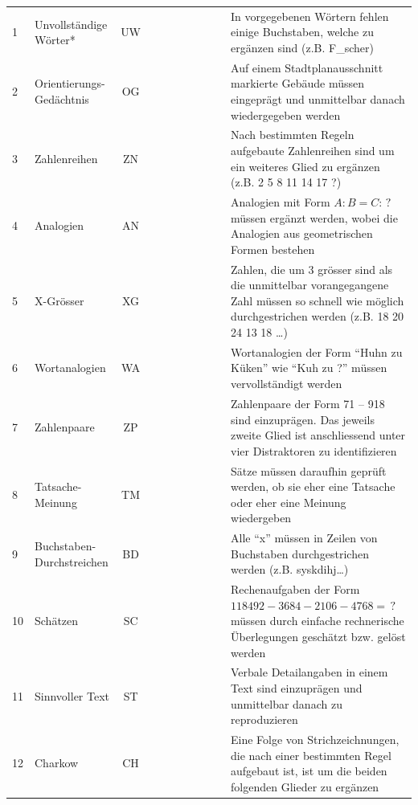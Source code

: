 \documentclass[11pt, twoside, a4paper]{book}		%
\begin{document}
\begin{table}
\begin{adjustbox}{width=\textwidth,totalheight=.9\textheight,keepaspectratio}
\begin{threeparttable}
\begin{tabular}{l l c c c c p{.0001cm} c c c p{20cm}}
				\hline
				1				&	Unvollständige Wörter*	&	UW			&&	\checkmark	&&&\checkmark&&& In vorgegebenen Wörtern fehlen einige Buchstaben, welche zu ergänzen sind (z.B. F\_scher)	\\
				2				&	Orientierungs-Gedächtnis	&	OG		&&&	\checkmark	&&&&\checkmark& Auf einem Stadtplanausschnitt markierte Gebäude müssen eingeprägt und unmittelbar danach wiedergegeben werden\\
				3				&	Zahlenreihen			&	ZN			&	\checkmark	&&&&&\checkmark&& Nach bestimmten Regeln aufgebaute Zahlenreihen sind um ein weiteres Glied zu ergänzen (z.B. 2 5 8 11 14 17 ?)\\
				4				&	Analogien				&	AN			&	\checkmark	&&&&&&\checkmark& Analogien mit Form $A:B=C:\,?$ müssen ergänzt werden, wobei die Analogien aus geometrischen Formen bestehen\\
				5				&	X-Grösser				&	XG			&&	\checkmark	&&&&\checkmark&& Zahlen, die um $3$ grösser sind als die unmittelbar vorangegangene Zahl müssen so schnell wie möglich durchgestrichen werden (z.B. 18 20 24 \cancel{27} 13 18 \cancel{21} \ldots)\\
				6				&	Wortanalogien			&	WA			&	\checkmark	&&&&\checkmark&&& Wortanalogien der Form \enquote{Huhn zu Küken} wie \enquote{Kuh zu ?} müssen vervollständigt werden\\
				7				&	Zahlenpaare				&	ZP			&&&	\checkmark	&&&\checkmark&& Zahlenpaare der Form 71 -- 918 sind einzuprägen. Das jeweils zweite Glied ist anschliessend unter vier Distraktoren zu identifizieren\\
				8				&	Tatsache-Meinung		&	TM			&	\checkmark	&&&&\checkmark&&& Sätze müssen daraufhin geprüft werden, ob sie eher eine Tatsache oder eher eine Meinung wiedergeben\\
				9				&	Buchstaben-Durchstreichen&	BD			&&	\checkmark	&&&&&\checkmark& Alle \enquote{x} müssen in Zeilen von Buchstaben durchgestrichen werden (z.B. sys\cancel{x}kdihj\cancel{x}\ldots)\\
				10				&	Schätzen				&	SC			&	\checkmark	&&&&&\checkmark&& Rechenaufgaben der Form $118492-3684-2106-4768=\,?$ müssen durch einfache rechnerische Überlegungen geschätzt bzw. gelöst werden\\
				11				&	Sinnvoller Text			&	ST			&&&	\checkmark	&&\checkmark&&& Verbale Detailangaben in einem Text sind einzuprägen und unmittelbar danach zu reproduzieren\\
				12				&	Charkow					&	CH			&	\checkmark	&&&&&&\checkmark& Eine Folge von Strichzeichnungen, die nach einer bestimmten Regel aufgebaut ist, ist um die beiden folgenden Glieder zu ergänzen\\

\end{tabular}
\end{threeparttable}
\end{adjustbox}
\end{table}
\end{document}
